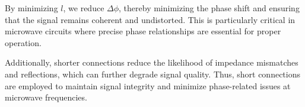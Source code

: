 By minimizing \(l\), we reduce \(\Delta \phi\), thereby minimizing the phase shift and ensuring that the signal remains coherent and undistorted. This is particularly critical in microwave circuits where precise phase relationships are essential for proper operation.

Additionally, shorter connections reduce the likelihood of impedance mismatches and reflections, which can further degrade signal quality. Thus, short connections are employed to maintain signal integrity and minimize phase-related issues at microwave frequencies.

